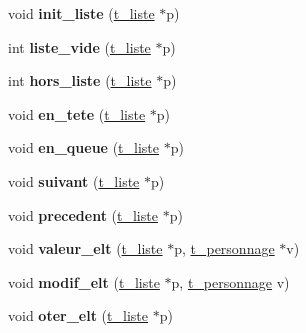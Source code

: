 \begin{DoxyCompactItemize}
\item 
void {\bfseries init\+\_\+liste} (\hyperlink{a00006}{t\+\_\+liste} $\ast$p)\hypertarget{a00024_ae54cf55c0d15211e5433ce9b5abf099d}{}\label{a00024_ae54cf55c0d15211e5433ce9b5abf099d}

\item 
int {\bfseries liste\+\_\+vide} (\hyperlink{a00006}{t\+\_\+liste} $\ast$p)\hypertarget{a00024_ae25051845f03a0ee659aed8e855dad5b}{}\label{a00024_ae25051845f03a0ee659aed8e855dad5b}

\item 
int {\bfseries hors\+\_\+liste} (\hyperlink{a00006}{t\+\_\+liste} $\ast$p)\hypertarget{a00024_aa42eefd0ac04de255ffb11f5e9fdabd6}{}\label{a00024_aa42eefd0ac04de255ffb11f5e9fdabd6}

\item 
void {\bfseries en\+\_\+tete} (\hyperlink{a00006}{t\+\_\+liste} $\ast$p)\hypertarget{a00024_a9a2af94927570339b5708b99c4831cf3}{}\label{a00024_a9a2af94927570339b5708b99c4831cf3}

\item 
void {\bfseries en\+\_\+queue} (\hyperlink{a00006}{t\+\_\+liste} $\ast$p)\hypertarget{a00024_a182d1a7bdc30807ebdd00d566994548d}{}\label{a00024_a182d1a7bdc30807ebdd00d566994548d}

\item 
void {\bfseries suivant} (\hyperlink{a00006}{t\+\_\+liste} $\ast$p)\hypertarget{a00024_ac95aadbae271f7e76ca486b6187dd8dd}{}\label{a00024_ac95aadbae271f7e76ca486b6187dd8dd}

\item 
void {\bfseries precedent} (\hyperlink{a00006}{t\+\_\+liste} $\ast$p)\hypertarget{a00024_a580b4a7d8c45590284303c3d1103a3e3}{}\label{a00024_a580b4a7d8c45590284303c3d1103a3e3}

\item 
void {\bfseries valeur\+\_\+elt} (\hyperlink{a00006}{t\+\_\+liste} $\ast$p, \hyperlink{a00009}{t\+\_\+personnage} $\ast$v)\hypertarget{a00024_ac7ee699d71e8dda4e6f64a30fc487a4a}{}\label{a00024_ac7ee699d71e8dda4e6f64a30fc487a4a}

\item 
void {\bfseries modif\+\_\+elt} (\hyperlink{a00006}{t\+\_\+liste} $\ast$p, \hyperlink{a00009}{t\+\_\+personnage} v)\hypertarget{a00024_a85cff63c489af0391880672f3c039e47}{}\label{a00024_a85cff63c489af0391880672f3c039e47}

\item 
void {\bfseries oter\+\_\+elt} (\hyperlink{a00006}{t\+\_\+liste} $\ast$p)\hypertarget{a00024_a405c291cfedcbb6077322f032ac99fb3}{}\label{a00024_a405c291cfedcbb6077322f032ac99fb3}


\end{DoxyCompactItemize}
